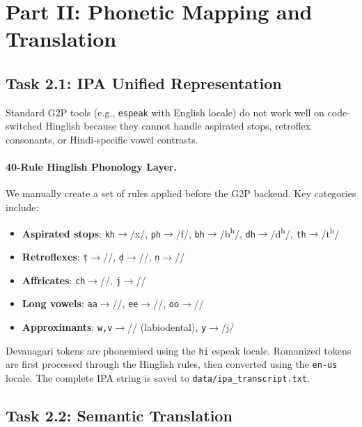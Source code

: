 \documentclass[10pt,twocolumn,letterpaper]{article}
\begin{document}
\section{Part II: Phonetic Mapping and Translation}
\label{sec:part2}

\subsection{Task 2.1: IPA Unified Representation}

Standard G2P tools (e.g., \texttt{espeak} with English locale) do not work well on code-switched Hinglish because they cannot handle aspirated stops, retroflex consonants, or Hindi-specific vowel contrasts.

\paragraph{40-Rule Hinglish Phonology Layer.} We manually create a set of rules applied before the G2P backend. Key categories include:
\begin{itemize}[noitemsep]
  \item \textbf{Aspirated stops}: \texttt{kh}$\to$/x/, \texttt{ph}$\to$/f/, \texttt{bh}$\to$/b\textsuperscript{h}/, \texttt{dh}$\to$/d\textsuperscript{h}/, \texttt{th}$\to$/t\textsuperscript{h}/
  \item \textbf{Retroflexes}: \texttt{\d{t}}$\to$/\textipa{\textrtailt}/, \texttt{\d{d}}$\to$/\textipa{\textrtaild}/, \texttt{\d{n}}$\to$/\textipa{\textrtailn}/
  \item \textbf{Affricates}: \texttt{ch}$\to$//, \texttt{j}$\to$//
  \item \textbf{Long vowels}: \texttt{aa}$\to$//, \texttt{ee}$\to$//, \texttt{oo}$\to$//
  \item \textbf{Approximants}: \texttt{w,v}$\to$/\textipa{\textscriptv}/ (labiodental), \texttt{y}$\to$/j/
\end{itemize}

Devanagari tokens are phonemised using the \texttt{hi} espeak locale. Romanized tokens are first processed through the Hinglish rules, then converted using the \texttt{en-us} locale. The complete IPA string is saved to \texttt{data/ipa\_transcript.txt}.

\subsection{Task 2.2: Semantic Translation}
\end{document}
